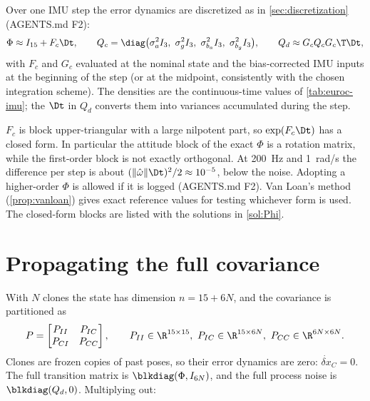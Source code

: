 Over one IMU step the error dynamics are discretized as in \cref{sec:discretization} (AGENTS.md F2):
\begin{equation}
  \Phi \approx I_{15} + F_c\Dt, \qquad
  Q_c = \diag\big(\sigma_a^2 I_3,\ \sigma_g^2 I_3,\ \sigma_{b_a}^2 I_3,\ \sigma_{b_g}^2 I_3\big), \qquad
  Q_d \approx G_c Q_c G_c\T\Dt ,
  \label{eq:imu-discretization}
\end{equation}
with $F_c$ and $G_c$ evaluated at the nominal state and the bias-corrected IMU inputs at the beginning of the
step (or at the midpoint, consistently with the chosen integration scheme). The densities are the
continuous-time values of \cref{tab:euroc-imu}; the $\Dt$ in $Q_d$ converts them into variances
accumulated during the step.

\begin{remark}
$F_c$ is block upper-triangular with a large nilpotent part, so $\exp(F_c\Dt)$ has a closed form. In particular the
attitude block of the exact $\Phi$ is a rotation matrix, while the first-order block is not exactly orthogonal. At
200~Hz and 1~rad/s the difference per step is about $(\|\hat\omega\|\Dt)^2/2 \approx 10^{-5}$, below the noise.
Adopting a higher-order $\Phi$ is allowed if it is logged (AGENTS.md F2). Van Loan's method
(\cref{prop:vanloan}) gives exact reference values for testing whichever form is used.
\ifsolutions The closed-form blocks are listed with the solutions in \cref{sol:Phi}.\fi
\end{remark}

\section{Propagating the full covariance}

With $N$ clones the state has dimension $n = 15 + 6N$, and the covariance is partitioned as
\begin{equation}
  P = \begin{bmatrix} P_{II} & P_{IC} \\ P_{CI} & P_{CC} \end{bmatrix},
  \qquad P_{II}\in\R^{15\times15},\ P_{IC}\in\R^{15\times6N},\ P_{CC}\in\R^{6N\times6N}.
\end{equation}
Clones are frozen copies of past poses, so their error dynamics are zero: $\dot{\delta x}_C = 0$. The full
transition matrix is $\blkdiag(\Phi, I_{6N})$, and the full process noise is $\blkdiag(Q_d, 0)$. Multiplying out:

